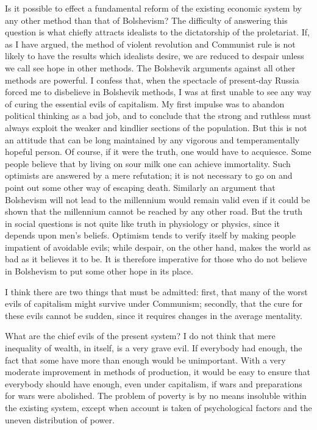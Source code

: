 Is it possible to effect a fundamental reform of the existing economic system by any other method than that of Bolshevism? The difficulty of answering this question is what chiefly attracts idealists to the dictatorship of the proletariat. If, as I have argued, the method of violent revolution and Communist rule is not likely to have the results which idealists desire, we are reduced to despair unless we call see hope in other methods. The Bolshevik arguments against all other methods are powerful. I confess that, when the spectacle of present-day Russia forced me to disbelieve in Bolshevik methods, I was at first unable to see any way of curing the essential evils of capitalism. My first impulse was to abandon political thinking as a bad job, and to conclude that the strong and ruthless must always exploit the weaker and kindlier sections of the population. But this is not an attitude that can be long maintained by any vigorous and temperamentally hopeful person. Of course, if it were the truth, one would have to acquiesce. Some people believe that by living on sour milk one can achieve immortality. Such optimists are answered by a mere refutation; it is not necessary to go on and point out some other way of escaping death. Similarly an argument that Bolshevism will not lead to the millennium would remain valid even if it could be shown that the millennium cannot be reached by any other road. But the truth in social questions is not quite like truth in physiology or physics, since it depends upon men's beliefs. Optimism tends to verify itself by making people impatient of avoidable evils; while despair, on the other hand, makes the world as bad as it believes it to be. It is therefore imperative for those who do not believe in Bolshevism to put some other hope in its place.

I think there are two things that must be admitted: first, that many of the worst evils of capitalism might survive under Communism; secondly, that the cure for these evils cannot be sudden, since it requires changes in the average mentality.

What are the chief evils of the present system? I do not think that mere inequality of wealth, in itself, is a very grave evil. If everybody had enough, the fact that some have more than enough would be unimportant. With a very moderate improvement in methods of production, it would be easy to ensure that everybody should have enough, even under capitalism, if wars and preparations for wars were abolished. The problem of poverty is by no means insoluble within the existing system, except when account is taken of psychological factors and the uneven distribution of power.

